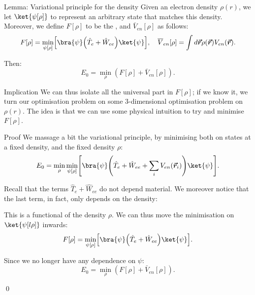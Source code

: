 \documentclass[a4paper]{article}
\begin{document}
\begin{parag}{Lemma: Variational principle for the density}
    Given an electron density $\rho\left(r\right)$, we let $\ket{\psi\left[\rho\right]}$ to represent an arbitrary state that matches this density. Moreover, we define $F\left[\rho\right]$ to be the , and $\bar{V}_{en}\left[\rho\right]$ as follows:
    \[F\left[\rho\right] = \min_{\psi\left[\rho\right]} \left[\bra{\psi} \left(\hat{T}_e + \hat{W}_{ee}\right) \ket{\psi}\right], \mathspace \bar{V}_{en}\left[\rho\right] = \int d \bvec{r} \rho\left(\bvec{r}\right) V_{en}\left(\bvec{r}\right).\]

    Then:
    \[E_0 = \min_{\rho}\left(F\left[\rho\right] + \bar{V}_{en}\left[\rho\right]\right).\]

    \begin{subparag}{Implication}
        We can thus isolate all the universal part in $F\left[\rho\right]$; if we know it, we turn our optimisation problem on some 3-dimensional optimisation problem on $\rho\left(r\right)$. The idea is that we can use some physical intuition to try and minimise $F\left[\rho\right]$.
    \end{subparag}

    \begin{subparag}{Proof}
        We massage a bit the variational principle, by minimising both on states at a fixed density, and the fixed density $\rho$: 
        \[E_0 = \min_{\rho} \min_{\psi\left[\rho\right]} \left[\bra{\psi} \left(\hat{T}_e + \hat{W}_{ee} + \sum_{i} V_{en}\left(\bvec{r}_i\right)\right) \ket{\psi}\right].\]

        Recall that the terms $\hat{T}_e + \hat{W}_{ee}$ do not depend material. We moreover notice that the last term, in fact, only depends on the density: 

        This is a functional of the density $\rho$. We can thus move the minimisation on $\ket{\psi\left[l\rho\right]}$ inwards:
        \[F\left[\rho\right] = \min_{\psi\left[\rho\right]} \left[\bra{\psi} \left(\hat{T}_e + \hat{W}_{ee}\right) \ket{\psi}\right].\]
        
        Since we no longer have any dependence on $\psi$:
        \[E_0 = \min_{\rho}\left(F\left[\rho\right] + \bar{V}_{en}\left[\rho\right]\right).\]

        \qed
    \end{subparag}
\end{parag}
\end{document}
